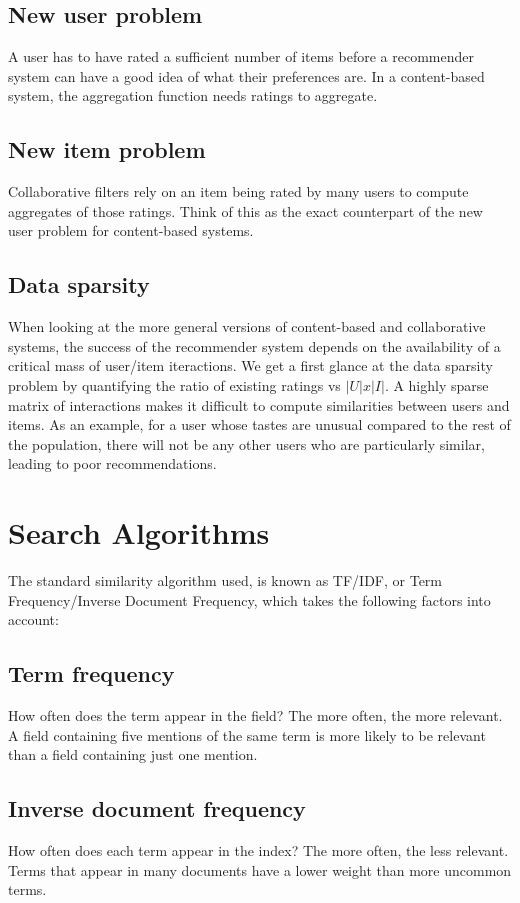\documentclass[a4 paper,11pt]{report}
\begin{document}
\subsection {New user problem}

A user has to have rated a sufficient number of items before a recommender
system can have a good idea of what their preferences are. In a content-based
system, the aggregation function needs ratings to aggregate.

\subsection {New item problem}

Collaborative filters rely on an item being rated by many users to compute
aggregates of those ratings. Think of this as the exact counterpart of the new
user problem for content-based systems.

\subsection {Data sparsity}

When looking at the more general versions of content-based and collaborative
systems, the success of the recommender system depends on the availability of a
critical mass of user/item iteractions. We get a first glance at the data
sparsity problem by quantifying the ratio of existing ratings vs $|U|x|I|$. A
highly sparse matrix of interactions makes it difficult to compute similarities
between users and items. As an example, for a user whose tastes are unusual
compared to the rest of the population, there will not be any other users who
are particularly similar, leading to poor recommendations.

\newpage
\section {Search Algorithms}
The standard similarity algorithm used, is known as TF/IDF, or Term Frequency/Inverse Document Frequency, which takes the following factors into account:\cite{es}
\subsection {Term frequency}
How often does the term appear in the field? The more often, the more relevant. A field containing five mentions of the same term is more likely to be relevant than a field containing just one mention.
\subsection {Inverse document frequency}
How often does each term appear in the index? The more often, the less relevant. Terms that appear in many documents have a lower weight than more uncommon terms.
\end{document}
